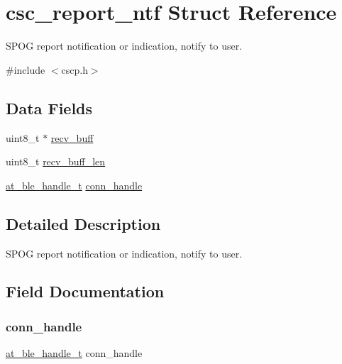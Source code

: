\hypertarget{structcsc__report__ntf}{}\section{csc\+\_\+report\+\_\+ntf Struct Reference}
\label{structcsc__report__ntf}


S\+P\+OG report notification or indication, notify to user.  




{\ttfamily \#include $<$cscp.\+h$>$}

\subsection*{Data Fields}
\begin{DoxyCompactItemize}
\item 
uint8\+\_\+t $\ast$ \mbox{\hyperlink{structcsc__report__ntf_a62db31036412e0d65022850a7f750993}{recv\+\_\+buff}}
\item 
uint8\+\_\+t \mbox{\hyperlink{structcsc__report__ntf_a60702265a30bbab4ed02114bb3f074ed}{recv\+\_\+buff\+\_\+len}}
\item 
\mbox{\hyperlink{at__ble__api_8h_abd23646d0c662860741f787efc8456f2}{at\+\_\+ble\+\_\+handle\+\_\+t}} \mbox{\hyperlink{structcsc__report__ntf_ae42df6fd8493f8f8faeccfdd6062e96f}{conn\+\_\+handle}}
\end{DoxyCompactItemize}


\subsection{Detailed Description}
S\+P\+OG report notification or indication, notify to user. 

\subsection{Field Documentation}
\mbox{\label{structcsc__report__ntf_ae42df6fd8493f8f8faeccfdd6062e96f}} 
\subsubsection{\texorpdfstring{conn\_handle}{conn\_handle}}
{\footnotesize\ttfamily \mbox{\hyperlink{at__ble__api_8h_abd23646d0c662860741f787efc8456f2}{at\+\_\+ble\+\_\+handle\+\_\+t}} conn\+\_\+handle}

